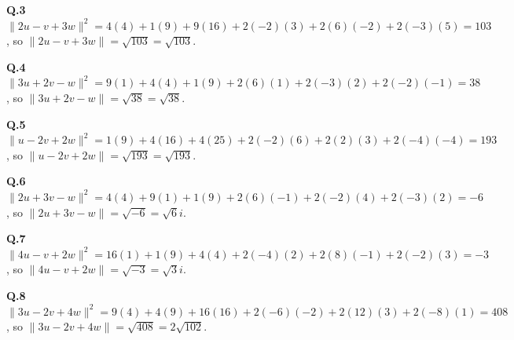 \noindent\textbf{Q.3} $\|2u-v+3w\|^2=4(4)+1(9)+9(16)+2(-2)(3)+2(6)(-2)+2(-3)(5)=103$, so $\|2u-v+3w\|=\sqrt{103}=\sqrt{103}$.


\noindent\textbf{Q.4} $\|3u+2v-w\|^2=9(1)+4(4)+1(9)+2(6)(1)+2(-3)(2)+2(-2)(-1)=38$, so $\|3u+2v-w\|=\sqrt{38}=\sqrt{38}$.


\noindent\textbf{Q.5} $\|u-2v+2w\|^2=1(9)+4(16)+4(25)+2(-2)(6)+2(2)(3)+2(-4)(-4)=193$, so $\|u-2v+2w\|=\sqrt{193}=\sqrt{193}$.


\noindent\textbf{Q.6} $\|2u+3v-w\|^2=4(4)+9(1)+1(9)+2(6)(-1)+2(-2)(4)+2(-3)(2)=-6$, so $\|2u+3v-w\|=\sqrt{-6}=\sqrt{6} i$.


\noindent\textbf{Q.7} $\|4u-v+2w\|^2=16(1)+1(9)+4(4)+2(-4)(2)+2(8)(-1)+2(-2)(3)=-3$, so $\|4u-v+2w\|=\sqrt{-3}=\sqrt{3} i$.


\noindent\textbf{Q.8} $\|3u-2v+4w\|^2=9(4)+4(9)+16(16)+2(-6)(-2)+2(12)(3)+2(-8)(1)=408$, so $\|3u-2v+4w\|=\sqrt{408}=2 \sqrt{102}$.


